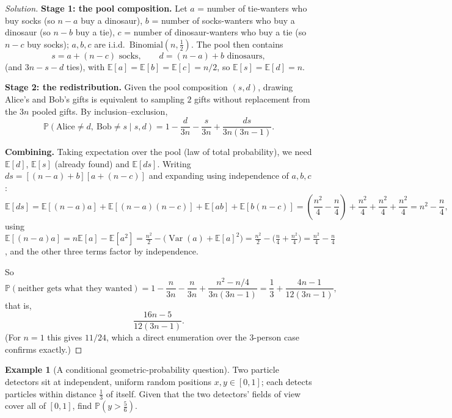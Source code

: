 \documentclass[11pt]{article}
\theoremstyle{definition}
\newtheorem{example}{Example}[section]
\newcommand{\E}{\mathbb{E}}
\newcommand{\Var}{\operatorname{Var}}
\begin{document}
\begin{proof}[Solution]
\textbf{Stage 1: the pool composition.} Let $a$ = number of tie-wanters who buy socks (so $n-a$ buy a dinosaur), $b$ = number of socks-wanters who buy a dinosaur (so $n-b$ buy a tie), $c$ = number of dinosaur-wanters who buy a tie (so $n-c$ buy socks); $a,b,c$ are i.i.d.\ $\mathrm{Binomial}(n,\tfrac12)$. The pool then contains
\[
s=a+(n-c) \text{ socks}, \qquad d=(n-a)+b \text{ dinosaurs},
\]
(and $3n-s-d$ ties), with $\E[a]=\E[b]=\E[c]=n/2$, so $\E[s]=\E[d]=n$.

\textbf{Stage 2: the redistribution.} Given the pool composition $(s,d)$, drawing Alice's and Bob's gifts is equivalent to sampling $2$ gifts without replacement from the $3n$ pooled gifts. By inclusion–exclusion,
\[
\mathbb{P}(\text{Alice}\ne d,\ \text{Bob}\ne s \mid s,d)=1-\frac{d}{3n}-\frac{s}{3n}+\frac{ds}{3n(3n-1)}.
\]

\textbf{Combining.} Taking expectation over the pool (law of total probability), we need $\E[d]$, $\E[s]$ (already found) and $\E[ds]$. Writing $ds=[(n-a)+b][a+(n-c)]$ and expanding using independence of $a,b,c$:
\[
\E[ds]=\E[(n-a)a]+\E[(n-a)(n-c)]+\E[ab]+\E[b(n-c)]
=\left(\frac{n^2}{4}-\frac{n}{4}\right)+\frac{n^2}{4}+\frac{n^2}{4}+\frac{n^2}{4}=n^2-\frac n4,
\]
using $\E[(n-a)a]=n\E[a]-\E[a^2]=\tfrac{n^2}2-\big(\Var(a)+\E[a]^2\big)=\tfrac{n^2}2-\big(\tfrac n4+\tfrac{n^2}4\big)=\tfrac{n^2}4-\tfrac n4$, and the other three terms factor by independence.

So
\[
\mathbb{P}(\text{neither gets what they wanted})=1-\frac{n}{3n}-\frac{n}{3n}+\frac{n^2-n/4}{3n(3n-1)}=\frac13+\frac{4n-1}{12(3n-1)},
\]
that is,
\[
\boxed{\dfrac{16n-5}{12(3n-1)}}.
\]
(For $n=1$ this gives $11/24$, which a direct enumeration over the $3$-person case confirms exactly.)
\end{proof}

\begin{example}[A conditional geometric-probability question]
Two particle detectors sit at independent, uniform random positions $x,y\in[0,1]$; each detects particles within distance $\tfrac13$ of itself. Given that the two detectors' fields of view cover all of $[0,1]$, find $\mathbb P\!\left(y>\tfrac56\right)$.
\end{example}
\end{document}
